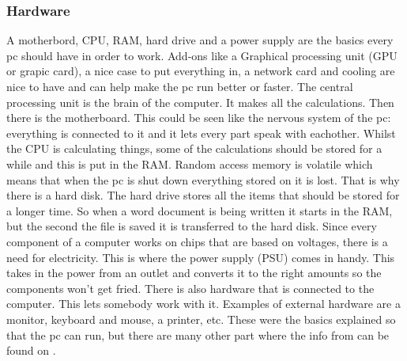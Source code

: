 \subsubsection{Hardware} \label{hardware}
A motherbord, CPU, RAM, hard drive and a power supply are the basics every pc should have in order to work.
Add-ons like a Graphical processing unit (GPU or grapic card), a nice case to put everything in, a network card and cooling are nice to have and can help make the pc run better or faster.
The central processing unit is the brain of the computer. It makes all the calculations.
Then there is the motherboard. This could be seen like the nervous system of the pc: everything is connected to it and it lets every part speak with eachother.
Whilst the CPU is calculating things, some of the calculations should be stored for a while and this is put in the RAM. Random access memory is volatile which means that when the pc is shut down everything stored on it is lost.
That is why there is a hard disk. The hard drive stores all the items that should be stored for a longer time. So when a word document is being written it starts in the RAM, but the second the file is saved it is transferred to the hard disk.
Since every component of a computer works on chips that are based on voltages, there is a need for electricity. This is where the power supply (PSU) comes in handy. This takes in the power from an outlet and converts it to the right amounts so the components won't get fried.
There is also hardware that is connected to the computer. This lets somebody work with it. Examples of external hardware are a monitor, keyboard and mouse, a printer, etc.
These were the basics explained so that the pc can run, but there are many other part where the info from can be found on \cite[https://edu.Fcfglobal.org/en/computerbasics/]{ComputerBasics}.

